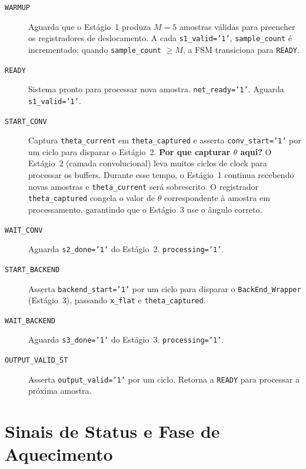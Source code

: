 \documentclass[a4paper,12pt]{article}
\begin{document}
\begin{description}
    \item[\texttt{WARMUP}] Aguarda que o Est\'agio~1 produza $M=5$ amostras v\'alidas para preencher os registradores de deslocamento. A cada \texttt{s1\_valid='1'}, \texttt{sample\_count} \'e incrementado; quando \texttt{sample\_count} $\geq M$, a FSM transiciona para \texttt{READY}.

    \item[\texttt{READY}] Sistema pronto para processar nova amostra. \texttt{net\_ready='1'}. Aguarda \texttt{s1\_valid='1'}.

    \item[\texttt{START\_CONV}] Captura \texttt{theta\_current} em \texttt{theta\_captured} e asserta \texttt{conv\_start='1'} por um ciclo para disparar o Est\'agio~2. \textbf{Por que capturar $\theta$ aqui?} O Est\'agio~2 (camada convolucional) leva muitos ciclos de clock para processar os buffers. Durante esse tempo, o Est\'agio~1 continua recebendo novas amostras e \texttt{theta\_current} ser\'a sobrescrito. O registrador \texttt{theta\_captured} congela o valor de $\theta$ correspondente \`a amostra em processamento, garantindo que o Est\'agio~3 use o \^angulo correto.

    \item[\texttt{WAIT\_CONV}] Aguarda \texttt{s2\_done='1'} do Est\'agio~2. \texttt{processing='1'}.

    \item[\texttt{START\_BACKEND}] Asserta \texttt{backend\_start='1'} por um ciclo para disparar o \texttt{BackEnd\_Wrapper} (Est\'agio~3), passando \texttt{x\_flat} e \texttt{theta\_captured}.

    \item[\texttt{WAIT\_BACKEND}] Aguarda \texttt{s3\_done='1'} do Est\'agio~3. \texttt{processing='1'}.

    \item[\texttt{OUTPUT\_VALID\_ST}] Asserta \texttt{output\_valid='1'} por um ciclo. Retorna a \texttt{READY} para processar a pr\'oxima amostra.
\end{description}


\section{Sinais de Status e Fase de Aquecimento}
\end{document}
